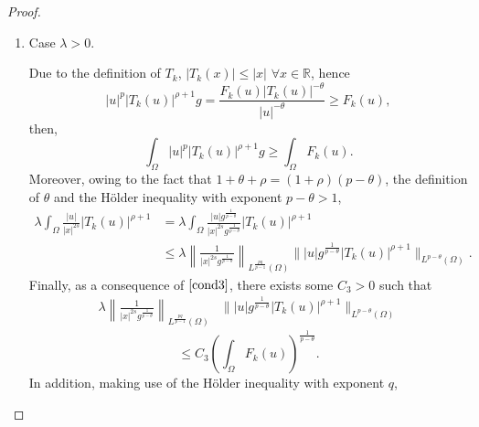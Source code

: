 \documentclass[preprint,12pt]{elsarticle}
\begin{document}
\begin{proof}
			\begin{enumerate}
				\item[a)] Case $\lambda>0$.\par 
				Due to the definition of $T_k$, $|T_k(x)|\leq |x|$ $\forall x \in \mathbb{R}$, hence
				\[|u|^{p }|T_k(u)|^{\rho+1}g=\frac{F_k(u)|T_k(u)|^{-\theta}}{|u|^{-\theta}}\geq F_k(u),\]
				then,
				\begin{equation}\label{ex1}
					\int_{\Omega} |u|^{p }|T_k(u)|^{\rho+1}g\geq \int_{\Omega}F_k(u).
				\end{equation}
				Moreover, owing to the fact that $1+\theta+\rho=(1+\rho)(p -\theta)$, the definition of $\theta$ and the H\"older inequality with exponent $p -\theta>1$, 		
				\begin{align*}
					\lambda\int_{\Omega}\frac{|u|}{|x|^{2s}}|T_k(u)|^{\rho+1}&=\lambda\int_{\Omega}\frac{|u|g^{\frac{1}{p -\theta}}}{|x|^{2s}g^{\frac{1}{p -\theta}}}|T_k(u)|^{\rho+1}\\&\leq \lambda \left\|\frac{1}{|x|^{2s}g^{\frac{1}{p -\theta}}}\right\|_{L^{\frac{p q}{p -1}}(\Omega)}\||u|g^{\frac{1}{p -\theta}}|T_k(u)|^{\rho+1}\|_{L^{p -\theta}(\Omega)}.
				\end{align*}
				Finally, as a consequence of $\eqref{cond3}$, there exists some $C_3>0$ such that
				\begin{align}\label{ex2}
					\lambda \left\|\frac{1}{|x|^{2s}g^{\frac{1}{p -\theta}}}\right\|_{L^{\frac{p q}{p -1}}(\Omega)}&\| |u|g^{\frac{1}{p -\theta}}|T_k(u)|^{\rho+1}\|_{L^{p -\theta}(\Omega)}
				\end{align}
				\[\leq C_3 \left(\int_{\Omega}F_k(u)\right)^{\frac{1}{p -\theta}}.\]
				In addition, making use of the H\"older inequality with exponent $q$,
				

\end{enumerate}
\end{proof}
\end{document}
